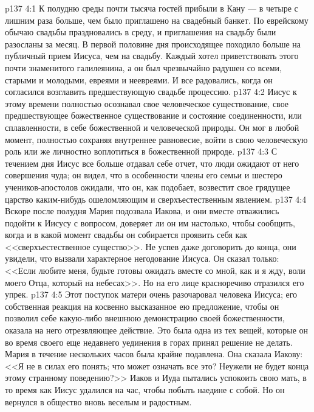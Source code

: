 \vs p137 4:1 К полудню среды почти тысяча гостей прибыли в Кану --- в четыре с лишним раза больше, чем было приглашено на свадебный банкет. По еврейскому обычаю свадьбы праздновались в среду, и приглашения на свадьбу были разосланы за месяц. В первой половине дня происходящее походило больше на публичный прием Иисуса, чем на свадьбу. Каждый хотел приветствовать этого почти знаменитого галилеянина, а он был чрезвычайно радушен со всеми, старыми и молодыми, евреями и неевреями. И все радовались, когда он согласился возглавить предшествующую свадьбе процессию.
\vs p137 4:2 Иисус к этому времени полностью осознавал свое человеческое существование, свое предшествующее божественное существование и состояние соединенности, или сплавленности, в себе божественной и человеческой природы. Он мог в любой момент, полностью сохраняя внутреннее равновесие, войти в свою человеческую роль или же личностно воплотиться в божественной природе.
\vs p137 4:3 С течением дня Иисус все больше отдавал себе отчет, что люди ожидают от него совершения чуда; он видел, что в особенности члены его семьи и шестеро учеников\hyp{}апостолов ожидали, что он, как подобает, возвестит свое грядущее царство каким\hyp{}нибудь ошеломляющим и сверхъестественным явлением.
\vs p137 4:4 Вскоре после полудня Мария подозвала Иакова, и они вместе отважились подойти к Иисусу с вопросом, доверяет ли он им настолько, чтобы сообщить, когда и в какой момент свадьбы он собирается проявить себя как <<сверхъестественное существо>>. Не успев даже договорить до конца, они увидели, что вызвали характерное негодование Иисуса. Он сказал только: <<Если любите меня, будьте готовы ожидать вместе со мной, как и я жду, воли моего Отца, который на небесах>>. Но на его лице красноречиво отразился его упрек.
\vs p137 4:5 Этот поступок матери очень разочаровал человека Иисуса; его собственная реакция на косвенно высказанное ею предложение, чтобы он позволил себе какую\hyp{}либо внешнюю демонстрацию своей божественности, оказала на него отрезвляющее действие. Это была одна из тех вещей, которые он во время своего еще недавнего уединения в горах принял решение не делать. Мария в течение нескольких часов была крайне подавлена. Она сказала Иакову: <<Я не в силах его понять; что может означать все это? Неужели не будет конца этому странному поведению?>> Иаков и Иуда пытались успокоить свою мать, в то время как Иисус удалился на час, чтобы побыть наедине с собой. Но он вернулся в общество вновь веселым и радостным.

